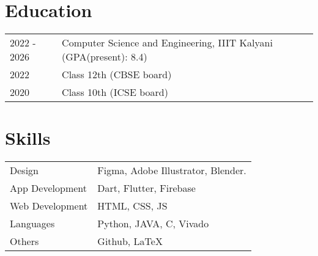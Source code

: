 \documentclass{article}
\begin{document}
\section{Education}
\begin{tabularx}{\linewidth}{@{}l X@{}}
2022 - 2026 & Computer Science and Engineering, IIIT Kalyani \hfill \normalsize (GPA(present): 8.4) \\
2022 & Class 12th (CBSE board) \\
2020 & Class 10th (ICSE board)\\
\end{tabularx}

\section{Skills}
\begin{tabularx}{\linewidth}{@{}l X@{}}
Design &  \normalsize{Figma, Adobe Illustrator, Blender.}\\
App Development  &  \normalsize{Dart, Flutter, Firebase}\\
Web Development  &  \normalsize{HTML, CSS, JS}\\  
Languages  &  \normalsize{Python, JAVA, C, Vivado}\\
Others &  \normalsize{Github, LaTeX}
\end{tabularx}
\end{document}
